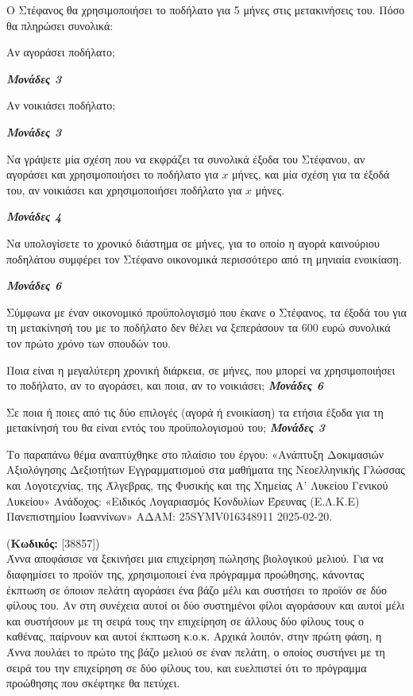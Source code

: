 \documentclass[11pt,a4paper,twoside]{book}
\newcounter{askhsh}[chapter]
\renewcommand{\theaskhsh}{
	\bf{\titlefont{\Large{\thechapter}}.\arabic{askhsh}}
}
\newcommand{\Askhsh}[2]{\refstepcounter{askhsh}{\titlefont{Άσκηση\theaskhsh} - \textcolor{maincolor}{ΘΕΜΑ #2}} (\small{\textbf{Κωδικός:} #1})\\}{}
\newcommand{\monades}[1]{
\hspace*{\fill}
\textbf{\textit{\textcolor{maincolor}{Μονάδες #1}}}}
\begin{document}
\begin{alist}
\item Ο Στέφανος θα χρησιμοποιήσει το ποδήλατο για 5 μήνες στις μετακινήσεις του. Πόσο θα πληρώσει συνολικά:


\begin{rlist}
\item
  Αν αγοράσει ποδήλατο;
\monades{3}

\item
  Αν νοικιάσει ποδήλατο;
\monades{3}
\end{rlist}
\item Να γράψετε μία σχέση που να εκφράζει τα συνολικά έξοδα του Στέφανου, αν αγοράσει και χρησιμοποιήσει το ποδήλατο για $x$ μήνες, και μία σχέση για τα έξοδά του, αν νοικιάσει και χρησιμοποιήσει ποδήλατο για $x$ μήνες.
\monades{4}
\item Να υπολογίσετε το χρονικό διάστημα σε μήνες, για το οποίο η αγορά καινούριου ποδηλάτου συμφέρει τον Στέφανο οικονομικά περισσότερο από τη μηνιαία ενοικίαση.
\monades{6}
\item Σύμφωνα με έναν οικονομικό προϋπολογισμό που έκανε ο Στέφανος, τα έξοδά του για τη μετακίνησή του με το ποδήλατο δεν θέλει να ξεπεράσουν τα 600 ευρώ συνολικά τον πρώτο χρόνο των σπουδών του.
\begin{rlist}
\item
  Ποια είναι η μεγαλύτερη χρονική διάρκεια, σε μήνες, που μπορεί να χρησιμοποιήσει το ποδήλατο, αν το αγοράσει, και ποια, αν το νοικιάσει;\monades{6}
\item
  Σε ποια ή ποιες από τις δύο επιλογές (αγορά ή ενοικίαση) τα ετήσια έξοδα για τη μετακίνησή του θα είναι εντός του προϋπολογισμού του;\monades{3}

{\footnotesize Το παραπάνω θέμα αναπτύχθηκε στο πλαίσιο του έργου: «Ανάπτυξη Δοκιμασιών Αξιολόγησης Δεξιοτήτων Εγγραμματισμού στα μαθήματα της Νεοελληνικής Γλώσσας και Λογοτεχνίας, της Άλγεβρας, της Φυσικής και της Χημείας Α' Λυκείου Γενικού Λυκείου» Ανάδοχος: «Ειδικός Λογαριασμός Κονδυλίων Έρευνας (Ε.Λ.Κ.Ε) Πανεπιστημίου Ιωαννίνων» ΑΔΑΜ: 25SYMV016348911 2025-02-20.}
\end{rlist}
\end{alist}

\vspace{4mm}

\Askhsh{[38857]}
Η Άννα αποφάσισε να ξεκινήσει μια επιχείρηση πώλησης βιολογικού μελιού. Για να διαφημίσει το προϊόν της, χρησιμοποιεί ένα πρόγραμμα προώθησης, κάνοντας έκπτωση σε όποιον πελάτη αγοράσει ένα βάζο μέλι και συστήσει το προϊόν σε δύο φίλους του. Αν στη συνέχεια αυτοί οι δύο συστημένοι φίλοι αγοράσουν και αυτοί μέλι και συστήσουν με τη σειρά τους την επιχείρηση σε άλλους δύο φίλους τους ο καθένας, παίρνουν και αυτοί έκπτωση κ.ο.κ. Αρχικά λοιπόν, στην πρώτη φάση, η Άννα πουλάει το πρώτο της βάζο μελιού σε έναν πελάτη, ο οποίος συστήνει με τη σειρά του την επιχείρηση σε δύο φίλους του, και ευελπιστεί ότι το πρόγραμμα προώθησης που σκέφτηκε θα πετύχει.
\end{document}
